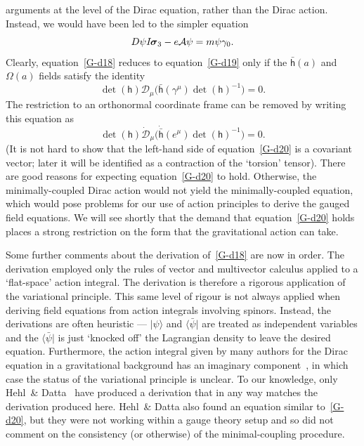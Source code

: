 \documentclass[a4paper]{article}
\numberwithin{equation}{section}
\newcommand{\la}{\langle}
\newcommand{\ra}{\rangle}
\newcommand{\sig}{\mbox{\boldmath $\sigma$}}
\newcommand{\Om}{\Omega}
\newcommand{\bsig}{\mbox{\boldmath $\sig$}}
\newcommand{\cla}{{\mathcal{A}}}
\newcommand{\cld}{{\mathcal{D}}}
\newcommand{\isk}{I \hspace{-1pt} \bsig_3}
\newcommand{\go}{\gamma_{0}}
\newcommand{\gamum}{\gamma^\mu}
\newcommand{\psibar}{\bar{\psi}}
\newcommand{\lih}{\mathsf{h}}
\newcommand{\lbh}{\bar{\mathsf{h}}}
\newcommand{\ho}{\lbh}
\newcommand{\hu}{\lih}
\newcommand{\dhi}{\det(\hu)^{-1}}
\renewcommand{\dh}{\det(\hu)}
\begin{document}
arguments at the level of the Dirac equation, rather than the Dirac
action.  Instead, we would have been led to the simpler equation
%
\begin{equation}
D \psi \isk -e\cla \psi = m \psi \go .
\label{G-d19}
\end{equation}
%
Clearly, equation~\eqref{G-d18} reduces to equation~\eqref{G-d19} only if the
$\ho(a)$ and $\Om(a)$ fields satisfy the identity
%
\begin{equation}
\dh \cld_\mu \bigl( \ho(\gamum) \dhi \bigr) = 0.
\end{equation}
%
The restriction to an orthonormal coordinate frame can be removed by
writing this equation as
%
\begin{equation}
\dh \dot{\cld}_\mu \bigl( \dot{\ho}(e^\mu) \dhi \bigr) = 0.
\label{G-d20}
\end{equation}
%
(It is not hard to show that the left-hand side of
equation~\eqref{G-d20} is a covariant vector; later it will be
identified as a contraction of the `torsion' tensor).  There are good
reasons for expecting equation~\eqref{G-d20} to hold.  Otherwise, the
minimally-coupled Dirac action would not yield the minimally-coupled
equation, which would pose problems for our use of action principles
to derive the gauged field equations.  We will see shortly that the
demand that equation~\eqref{G-d20} holds places a strong restriction
on the form that the gravitational action can take.


Some further comments about the derivation of~\eqref{G-d18} are now in
order.  The derivation employed only the rules of vector and
multivector calculus applied to a `flat-space' action integral.  The
derivation is therefore a rigorous application of the variational
principle.  This same level of rigour is not always applied when
deriving field equations from action integrals involving spinors.
Instead, the derivations are often heuristic --- $|\psi\ra$ and
$\la\psibar|$ are treated as independent variables and the
$\la\psibar|$ is just `knocked off' the Lagrangian density to leave
the desired equation.  Furthermore, the action integral given by many
authors for the Dirac equation in a gravitational background has an
imaginary component~\cite{nak-geom,goc-diff}, in which case the status
of the variational principle is unclear.  To our knowledge, only
Hehl~\& Datta~\cite{heh76} have produced a derivation that in any way
matches the derivation produced here.  Hehl~\& Datta also found an
equation similar to~\eqref{G-d20}, but they were not working within a
gauge theory setup and so did not comment on the consistency (or
otherwise) of the minimal-coupling procedure.
\end{document}
